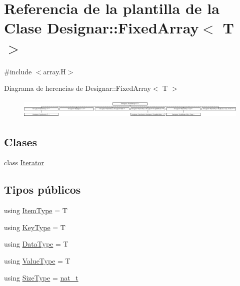 \hypertarget{class_designar_1_1_fixed_array}{}\section{Referencia de la plantilla de la Clase Designar\+:\+:Fixed\+Array$<$ T $>$}
\label{class_designar_1_1_fixed_array}


{\ttfamily \#include $<$array.\+H$>$}

Diagrama de herencias de Designar\+:\+:Fixed\+Array$<$ T $>$\begin{figure}[H]
\begin{center}
\leavevmode
\includegraphics[height=0.924092cm]{class_designar_1_1_fixed_array}
\end{center}
\end{figure}
\subsection*{Clases}
\begin{DoxyCompactItemize}
\item 
class \hyperlink{class_designar_1_1_fixed_array_1_1_iterator}{Iterator}
\end{DoxyCompactItemize}
\subsection*{Tipos públicos}
\begin{DoxyCompactItemize}
\item 
using \hyperlink{class_designar_1_1_fixed_array_abfeb4e683cee75ae782ad20294c4c808}{Item\+Type} = T
\item 
using \hyperlink{class_designar_1_1_fixed_array_a3a725cf21783340b8aca29dd1db0acf0}{Key\+Type} = T
\item 
using \hyperlink{class_designar_1_1_fixed_array_a3e37931b909b840cb7a40fc73f12bcf5}{Data\+Type} = T
\item 
using \hyperlink{class_designar_1_1_fixed_array_ac1cfeb4403a2dcbffd7ef494e5b873d0}{Value\+Type} = T
\item 
using \hyperlink{class_designar_1_1_fixed_array_a503ae414cc313d248e77c08e62ef043c}{Size\+Type} = \hyperlink{namespace_designar_aa72662848b9f4815e7bf31a7cf3e33d1}{nat\+\_\+t}
\end{DoxyCompactItemize}
